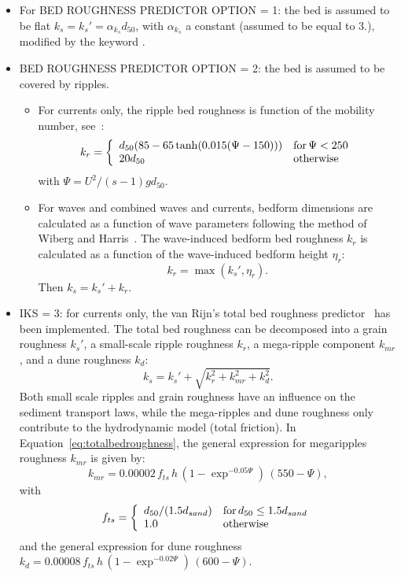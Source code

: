 \begin{itemize}
\item For {\ttfamily BED ROUGHNESS PREDICTOR OPTION = 1}: the bed is assumed to be flat $k_s = k_s'= \alpha_{k_s} d_{50}$, with $\alpha_{k_s}$ a constant (assumed to be equal to $3.$), modified by the keyword .
\item {\ttfamily BED ROUGHNESS PREDICTOR OPTION = 2}: the bed is assumed to be covered by ripples.
  \begin{itemize}
    \item For currents only, the ripple bed roughness is function of the mobility number, see~\cite{vanRijn07}:
\begin{equation*}
k_r =\left\{\begin{array}{ll}
d_{50}(85-65\tanh(0.015(\Psi-150))) & \text{for\,} \Psi<250\\
20 d_{50} & \text{otherwise}
\end{array}
\right.
\end{equation*}
with $\Psi =U^2/(s-1)gd_{50}$.

    \item For waves and combined waves and currents, bedform dimensions are calculated
as a function of wave parameters following the method of Wiberg and Harris~\cite{WibergHarris}.
The wave-induced bedform bed roughness $k_r$ is calculated as a function of the wave-induced bedform
height $\eta_r$:
\begin{equation}
k_r = \max(k_s', \eta_r).
\end{equation}
Then $k_s=k_s'+k_r$.
  \end{itemize}

\item {\ttfamily IKS = 3}: for currents only, the van Rijn's total bed roughness predictor~\cite{vanRijn07, Huybrechts} has been implemented.
The total bed roughness can be decomposed into a grain
roughness $k_s'$, a small-scale ripple roughness $k_r$, a mega-ripple
component $k_{mr}$, and a dune roughness $k_d$:
\begin{equation}\label{eq:totalbedroughness}
k_s = k_s' + \sqrt{k_r^2 + k_{mr}^2 + k_d^2}.
\end{equation}
Both small scale ripples and grain roughness have an influence on the
sediment transport laws, while the mega-ripples and dune roughness only
contribute to the hydrodynamic model (total friction). In Equation~\ref{eq:totalbedroughness}, the general expression for megaripples roughness $k_{mr}$ is given by:
\begin{equation}
k_{mr} = 0.00002\,f_{ts}\,h\,(1-\exp^{-0.05\Psi})\,(550-\Psi),
\end{equation}
with
\begin{equation*}
f_{ts} =\left\{\begin{array}{ll}
d_{50}/(1.5d_{sand}) & \text{for\,} d_{50}\leq 1.5d_{sand}\\
1.0 & \text{otherwise}
\end{array}
\right.
\end{equation*}
and the general expression for dune roughness $k_d=0.00008\,f_{ts}\,h\,(1-\exp^{-0.02\Psi})\,(600-\Psi)$.

\end{itemize}

